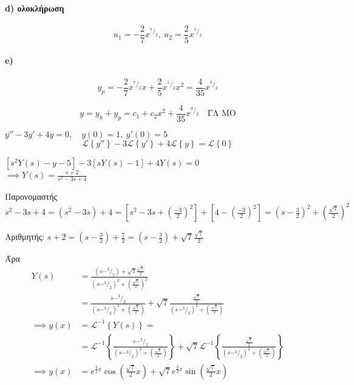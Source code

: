 \documentclass[11pt,a4paper,titlepage,draft]{article}
\begin{document}
\begin{exercise*}{6.1}
	\paragraph{\textlatin{d}) ολοκλήρωση}
	\[
	u_1=-\frac{2}{7}x^{^7/_2},\ u_2=\frac{2}{5}x^{^5/_2}
	\]
	
	\paragraph{\textlatin{e})}
	\[
	y_p = -\frac{2}{7}x^{^7/_2}x + \frac{2}{5}x^{^5/_2}x^2 = \frac{4}{35}x^{^9/_2}
	\]
	
	\[
	\boxed{
		y=y_h+y_p=c_1+c_2x^2+\frac{4}{35}x^{^9/_2}
		} \quad \text{ΓΛ ΜΟ}
	\]
\end{exercise*}

\begin{exercise*}{12.4}
	\(y''-3y'+4y=0, \quad y(0)=1,\ y'(0)=5\)
	\tcblower
	\[
	\mathscr L \left\lbrace y'' \right\rbrace - 3\mathscr L\left\lbrace y' \right\rbrace
	+4\mathscr L\left\lbrace y \right\rbrace = \mathscr L\left\lbrace 0 \right\rbrace
	\]
	
	\( \left[s^2Y(s)-y-5\right] -3\left[sY(s)-1 \right] + 4Y(s) = 0\) \\
	\( \implies Y(s) = \frac{s+2}{s^2-3s+4} \)
	
    Παρονομαστής \( s^2-3s+4 = (s^2-3s)+4 = \left[ s^2-3s+\left(
    \frac{-3}{2}
    \right)^2 \right] + 
    \left[ 4-\left(
    \frac{-3}{2}
    \right)^2 \right] = \left(
    s-\frac{3}{2}
    \right)^2 + \left(\frac{\sqrt{7}}{2}\right)^2
    \)
    
    Αριθμητής: \( s+2 = \left(s-\frac{3}{2}\right) + \frac{7}{2} 
    = \left(s-\frac{3}{2}\right)+ \sqrt{7}\frac{\sqrt{7}}{2}
    \)
    
    Άρα \begin{align*} 
    Y(s) &= \frac{(s-^3/_2)+\sqrt{7}\frac{\sqrt{7}}{2}}{(s-^3/_2)^2+\left(\frac{\sqrt{7}}{2}\right)^2}
    \\ &=
    \frac{s-^3/_2}{(s- ^3/_2)^2+\left(\frac{\sqrt{7}}{2}\right)}+\sqrt{7}\frac{\frac{\sqrt{7}}{2}}{(s-^3/_2)^2+\left(\frac{\sqrt{7}}{2}\right)} \\
    \implies y(x) &= \mathscr L^{-1} \left\lbrace Y(s) \right\rbrace = \\
    &= \mathscr L^{-1}\left\lbrace 
    \frac{s-^3/_2}{(s- ^3/_2)^2+\left(\frac{\sqrt{7}}{2}\right)}
    \right\rbrace + \sqrt{7} \mathscr L^{-1} \left\lbrace 
    \frac{\frac{\sqrt{7}}{2}}{(s-^3/_2)^2+\left(\frac{\sqrt{7}}{2}\right)}
     \right\rbrace \\
     \implies y(x) &= e^{\frac{3}{2}x}\cos(\frac{\sqrt{7}}{2}x)+\sqrt{7}e^{\frac{3}{2}x}\sin(\frac{\sqrt{7}}{2}x)
     \end{align*}
\end{exercise*}
\end{document}
